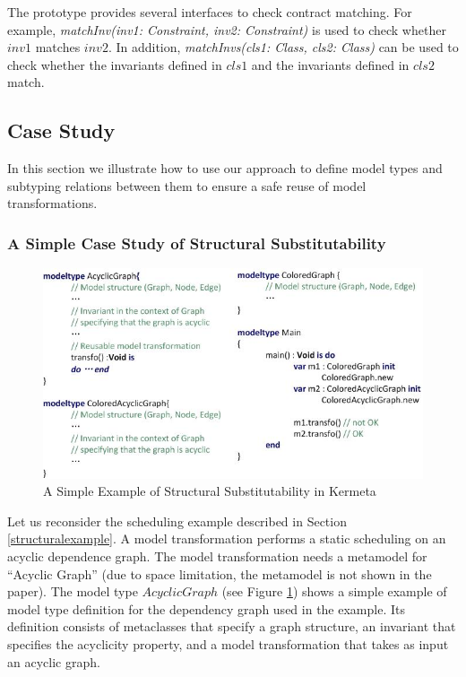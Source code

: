 The prototype provides several interfaces to check contract matching.
For example, {\em matchInv(inv1: Constraint, inv2: Constraint)} is used to check whether $inv1$ matches $inv2$.
In addition, {\em matchInvs(cls1: Class, cls2: Class)} can be used to check whether the invariants defined in $cls1$ and the invariants defined in $cls2$ match. 


\subsection{Case Study}\label{casestudy}

In this section we illustrate how to use our approach to define model types and subtyping relations between them to ensure a safe reuse of model transformations.

\subsubsection{A Simple Case Study of Structural Substitutability}

\begin{figure}[!t]
\centering
\includegraphics[width=4.8in]{fig/CaseStudy1.jpg}
\caption{A Simple Example of Structural Substitutability in Kermeta}
\label{fig:casestudy1}
\end{figure}

Let us reconsider the scheduling example described in Section \ref{structuralexample}.
A model transformation performs a static scheduling on an acyclic dependence graph.
The model transformation needs a metamodel for ``Acyclic Graph'' (due to space limitation, the metamodel is not shown in the paper).  
The model type $AcyclicGraph$ (see Figure \ref{fig:casestudy1}) shows a simple example of model type definition for the dependency graph used in the example. 
Its definition consists of metaclasses that specify a graph structure, an invariant that specifies the acyclicity property, and a model transformation that takes as input an acyclic graph.

